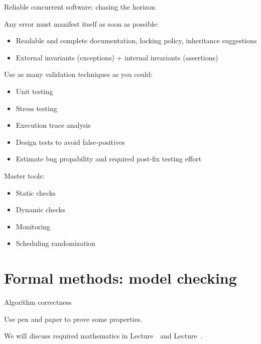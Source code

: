 \begin{frame}{Reliable concurrent software: chasing the horizon}

Any error must manifest itself as soon as possible:
\begin{itemize}
  \item Readable and complete documentation, locking policy, inheritance suggestions
  \item External invariants (exceptions) + internal invariants (assertions)
\end{itemize} 

Use as many validation techniques as you could:
\begin{itemize}
  \item Unit testing
  \item Stress testing
  \item Execution trace analysis
  \item Design tests to avoid false-positives
  \item Estimate bug propability and required post-fix testing effort
\end{itemize} 

Master tools:
\begin{itemize}
  \item Static checks
  \item Dynamic checks
  \item Monitoring
  \item Scheduling randomization
\end{itemize} 

\end{frame}


\section{Formal methods: model checking}
\showTOC

\begin{frame}{Algorithm correctness}

Use pen and paper to prove some properties.

\pause

We will discuss required mathematics in Lecture~\foundationsNum \ and Lecture~\foundationsPlusNum.

\end{frame}


